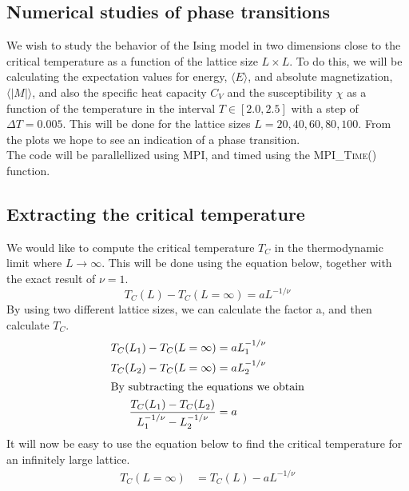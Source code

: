 \documentclass[../main.tex]{subfiles}
\begin{document}
\subsection{Numerical studies of phase transitions}
We wish to study the behavior of the Ising model in two dimensions close to the critical temperature as a function of the lattice size $L \times L$.  To do this, we will be calculating the expectation values for energy, $\langle E \rangle$, and absolute magnetization, $\langle |M| \rangle$, and also the specific heat capacity $C_V$ and the susceptibility $\chi$ as a function of the temperature in the interval $ T \in [2.0,2.5]$ with a step of $\Delta T = 0.005$. This will be done for the lattice sizes $L = {20, 40, 60, 80, 100}$. From the plots we hope to see an indication of a phase transition.\\
The code will be parallellized using MPI, and timed using the \textsc{MPI\_Time()} function.

\subsection{Extracting the critical temperature} \label{sec:theory-extractingTC}
We would like to compute the critical temperature $T_C$ in the thermodynamic limit where $L \rightarrow \infty$. This will be done using the equation below, together with the exact result of $\nu = 1$.
\[T_C(L) - T_C(L = \infty) = aL^{-1/\nu}\]
By using two different lattice sizes, we can calculate the factor a, and then calculate  $T_C$.
\begin{align}
  T_C(L_1) - T_C(L = \infty) &= aL_1^{-1/\nu} \nonumber\\
  T_C(L_2) - T_C(L = \infty) &= aL_2^{-1/\nu} \nonumber\\
  \intertext{By subtracting the equations we obtain}
  \frac{T_C(L_1) - T_C(L_2)}{L_1^{-1/\nu} - L_2^{-1/\nu}} &= a \label{eq:a}
\end{align}
It will now be easy to use the equation below to find the critical temperature for an infinitely large lattice.
\begin{align}
T_C(L = \infty) &= T_C(L) - aL^{-1/\nu} \label{eq:TC}
\end{align}
\end{document}
